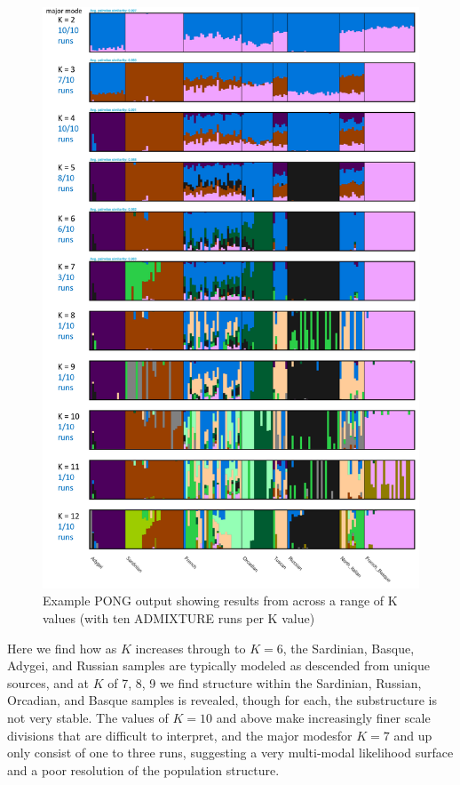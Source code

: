 \documentclass[smallextended]{svmult}       %
\begin{document}
\begin{figure}
\includegraphics[width=1\linewidth]{./plot/H938_Euro_LDprune_12K_10r} \caption{Example PONG output showing results from across a range of K values (with ten ADMIXTURE runs per K value)}\label{fig:unnamed-chunk-15}
\end{figure}

Here we find how as \(K\) increases through to \(K=6\), the Sardinian,
Basque, Adygei, and Russian samples are typically modeled as descended
from unique sources, and at \(K\) of 7, 8, 9 we find structure within
the Sardinian, Russian, Orcadian, and Basque samples is revealed, though
for each, the substructure is not very stable. The values of \(K=10\)
and above make increasingly finer scale divisions that are difficult to
interpret, and the major modesfor \(K=7\) and up only consist of one to
three runs, suggesting a very multi-modal likelihood surface and a poor
resolution of the population structure.
\end{document}
